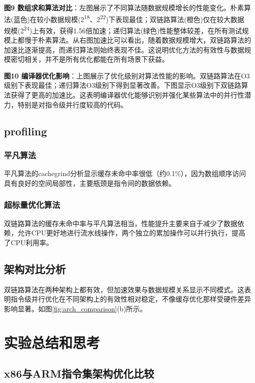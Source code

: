 \documentclass[a4paper,colorlinks=true,linkcolor=blue,urlcolor=blue,citecolor=green,bookmarks=true]{article}
\begin{document}
\textbf{图9 数组求和算法对比}：左图展示了不同算法随数据规模增长的性能变化。朴素算法(蓝色)在较小数据规模(2\textsuperscript{18}、2\textsuperscript{22})下表现最佳；双链路算法(橙色)仅在较大数据规模(2\textsuperscript{24})上有效，获得1.56倍加速；递归算法(绿色)性能整体较差，在所有测试规模上都慢于朴素算法。从右图加速比可以看出，随着数据规模增大，双链路算法的加速比逐渐提高，而递归算法则始终表现不佳。这说明优化方法的有效性与数据规模密切相关，并不是所有优化都能在所有场景下获益。

\textbf{图10 编译器优化影响}：上图展示了优化级别对算法性能的影响。双链路算法在O3级别下表现最佳；递归算法O3级别下得到显著改善。下图显示O3级别下双链路算法获得了更高的加速比。这表明编译器优化能够识别并强化某些算法中的并行性潜力，特别是对指令级并行度较高的代码。

\subsection{profiling}

\subsubsection{平凡算法}

平凡算法的cachegrind分析显示缓存未命中率很低（约0.1\%），因为数组顺序访问具有良好的空间局部性，主要瓶颈是指令间的数据依赖。

\subsubsection{超标量优化算法}

双链路算法的缓存未命中率与平凡算法相当，性能提升主要来自于减少了数据依赖，允许CPU更好地进行流水线操作，两个独立的累加操作可以并行执行，提高了CPU利用率。

\subsection{架构对比分析}

双链路算法在两种架构上都有效，但加速效果与数据规模关系显示不同模式。这表明指令级并行优化在不同架构上的有效性相对稳定，不像缓存优化那样受硬件差异影响显著。如图\ref{fig:arch_comparison}(b)所示。

\section{实验总结和思考}

\subsection{x86与ARM指令集架构优化比较}
\end{document}
